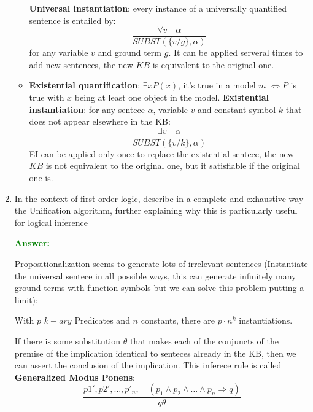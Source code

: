 \documentclass[12pt]{article}
\begin{document}
\begin{enumerate}[label=\textbf{FOL.\arabic*}]
\begin{itemize}
        \textbf{Universal instantiation}: every instance of a universally quantified sentence is entailed by: 
        \begin{equation}
            \frac{\forall v \quad \alpha}{SUBST(\{v/g\},\alpha)}
        \end{equation}
        for any variable $v$ and ground term $g$. It can be applied serveral times to add new sentences, the new $KB$ is equivalent to the original one.
        \item\textbf{Existential quantification}: $\exists x P(x)$, it's true in a model $m$ $\iff P$ is true with $x$ being 
        at least one object in the model.
        \textbf{Existential instantiation}: for any sentece $\alpha$, variable $v$ and constant symbol $k$ that does not appear elsewhere in the KB:
        \begin{equation}
            \frac{\exists v \quad \alpha}{SUBST(\{v/k\},\alpha)}
        \end{equation}
        EI can be applied only once to replace the existential sentece, the new $KB$ is not equivalent to the original one, but it satisfiable
        if the original one is.
    \end{itemize}

    \item In the context of first order logic, describe in a complete and exhaustive way the Unification algorithm, further explaining why this is particularly useful for logical inference
    
    \textcolor{green}{\textbf{Answer:}}

    Propositionalization seems to generate lots of irrelevant sentences (Instantiate the universal sentece in all possible ways, this can generate infinitely many ground terms with function symbols but we can solve this problem putting a limit):
    \begin{center}
        With $p$ $k-ary$ Predicates and $n$ constants, there are $p\cdot n^k$ instantiations.
    \end{center}

    If there is some substitution $\theta$ that makes each of the conjuncts of the premise of the implication identical 
    to senteces already in the KB, then we can assert the conclusion of the implication.
    This inferece rule is called \textbf{Generalized Modus Ponens}:
    \begin{equation}
        \frac{p1',p2',\ldots,p'_n,\quad (p_1\land p_2\land\ldots\land p_n \Rightarrow q)}
        {q\theta}
    \end{equation}


\end{enumerate}
\end{document}
